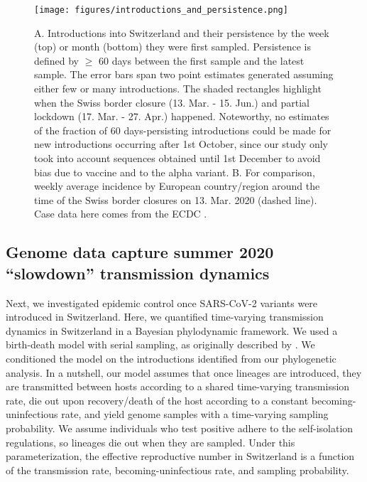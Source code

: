 \documentclass[11pt,twoside,lineno]{pnas-new} %
\begin{document}
\begin{figure}[H]
\centering
\texttt{[image: figures/introductions\_and\_persistence.png]}
\caption{A. Introductions into Switzerland and their persistence by the week (top) or month (bottom) they were first sampled. Persistence is defined by $\geq$ 60 days between the first sample and the latest sample. The error bars span two point estimates generated assuming either few or many introductions. The shaded rectangles highlight when the Swiss border closure (13. Mar. - 15. Jun.) and partial lockdown (17. Mar. - 27. Apr.) happened. Noteworthy, no estimates of the fraction of 60 days-persisting introductions could be made for new introductions occurring after 1st October, since our study only took into account sequences obtained until 1st December to avoid bias due to vaccine and to the alpha variant. B. For comparison, weekly average incidence by European country/region around the time of the Swiss border closures on 13. Mar. 2020 (dashed line). Case data here comes from the ECDC \cite{ECDC}.}
\label{fig:chain-longevity}
\end{figure}

\subsection{Genome data capture summer 2020 ``slowdown'' transmission dynamics}

Next, we investigated epidemic control once SARS-CoV-2 variants were introduced in Switzerland. Here, we quantified time-varying transmission dynamics in Switzerland in a Bayesian phylodynamic framework. We used a birth-death model with serial sampling, as originally described by \cite{stadler_2010_bds}. We conditioned the model on the introductions identified from our phylogenetic analysis. In a nutshell, our model assumes that once lineages are introduced, they are transmitted between hosts according to a shared time-varying transmission rate, die out upon recovery/death of the host according to a constant becoming-uninfectious rate, and yield genome samples with a time-varying sampling probability. We assume individuals who test positive adhere to the self-isolation regulations, so lineages die out when they are sampled. Under this parameterization, the effective reproductive number in Switzerland is a function of the transmission rate, becoming-uninfectious rate, and sampling probability.
\end{document}
